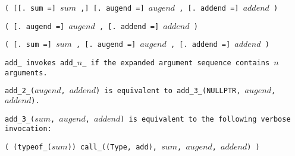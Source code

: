 
\s\s\s\tt{(} [[\tt{. sum =}] $sum$ \tt{,}]
[\tt{. augend =}] $augend$ \tt{,} [\tt{. addend =}] $addend$ \tt{)}

\s\tt{(} \phantom{[}[\tt{. augend =}]
$augend$ \tt{,} [\tt{. addend =}] $addend$ \tt{)}

\s\tt{(} \phantom{[}[\tt{. sum =}] $sum$ \tt{,}\phantom{]}
[\tt{. augend =}] $augend$ \tt{,} [\tt{. addend =}] $addend$ \tt{)}


\tt{add_} invokes \tt{add_}$n$\_ if the
expanded argument sequence contains $n$ arguments.

\tt{add_2_(}$augend$\tt{,} $addend$\tt{)} is equivalent to
\tt{add_3_(NULLPTR,} $augend$\tt{,} $addend$\tt{)}.

\tt{add_3_(}$sum$\tt{,} $augend$\tt{,} $addend$\tt{)}
is equivalent to the following verbose invocation:

\enlargethispage*{\baselineskip}
\begin{center}
\tt{( (typeof_(}$sum$\tt{)) call_((Type, add),}
$sum$\tt{,} $augend$\tt{,} $addend$\tt{) )}
\end{center}
